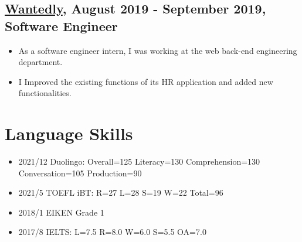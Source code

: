 \documentclass{article}
\begin{document}
  \subsection*{\href{https://wantedlyinc.com/ja}{Wantedly}, August 2019 - September 2019, Software Engineer}
    \begin{itemize}
      \item As a software engineer intern, I was working at the web back-end engineering department.
      \item I Improved the existing functions of its HR application and added new functionalities.
    \end{itemize}

\section*{Language Skills}
  \begin{itemize}
    \item 2021/12 Duolingo: Overall=125 Literacy=130 Comprehension=130 Conversation=105 Production=90
    \item 2021/5 TOEFL iBT: R=27 L=28 S=19 W=22 Total=96
    \item 2018/1 EIKEN Grade 1
    \item 2017/8 IELTS: L=7.5 R=8.0 W=6.0 S=5.5 OA=7.0
  \end{itemize}
\end{document}
